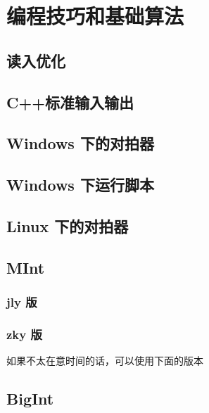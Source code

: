 \chapter{编程技巧和基础算法}

\section{读入优化}


\section{C++标准输入输出}
















\section{Windows 下的对拍器}


\section{Windows 下运行脚本}




\section{Linux 下的对拍器}



\section{MInt}
\subsection{jly 版}


\subsection{zky 版}
如果不太在意时间的话，可以使用下面的版本



\section{BigInt}

